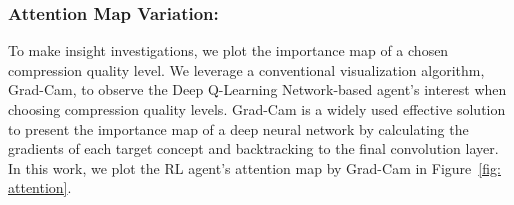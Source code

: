 \subsubsection{Attention Map Variation:}
\label{subsec: attention map}

To make insight investigations, we plot the importance map of a chosen compression quality level. We leverage a conventional visualization algorithm, Grad-Cam, to observe the Deep Q-Learning Network-based agent's interest when choosing compression quality levels. Grad-Cam is a widely used effective solution to present the importance map of a deep neural network by calculating the gradients of each target concept and backtracking to the final convolution layer. In this work, we plot the RL agent's attention map by Grad-Cam in Figure~\ref{fig: attention}. %


